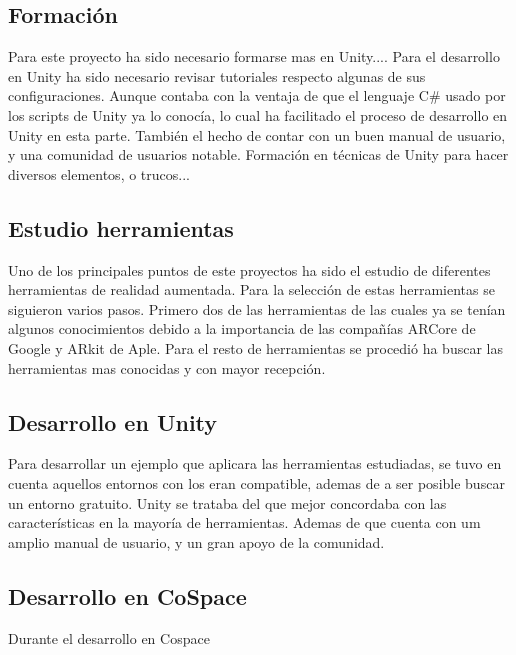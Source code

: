 
\subsection{Formación}
Para este proyecto ha sido necesario formarse mas en Unity....
Para el desarrollo en Unity ha sido necesario revisar tutoriales respecto algunas de sus configuraciones.
Aunque contaba con la ventaja de que el lenguaje C\# usado por los scripts de Unity ya lo conocía, lo cual ha facilitado el proceso de desarrollo en Unity en esta parte. También el hecho de contar con un buen manual de usuario, y una comunidad de usuarios notable.
Formación en técnicas de Unity para hacer diversos elementos, o trucos...
\subsection{Estudio herramientas}
Uno de los principales puntos de este proyectos ha sido el estudio de diferentes herramientas de realidad aumentada. Para la selección de estas herramientas se siguieron varios pasos. Primero dos de las herramientas de las cuales ya se tenían algunos conocimientos debido a la importancia de las compañías ARCore de Google y ARkit de Aple. Para el resto de herramientas se procedió ha buscar las herramientas mas conocidas y con mayor recepción.
\subsection{Desarrollo en Unity}
Para desarrollar un ejemplo que aplicara las herramientas estudiadas, se tuvo en cuenta aquellos entornos con los eran compatible, ademas de a ser posible buscar un entorno gratuito. Unity se trataba del que mejor concordaba con las características en la mayoría de herramientas. Ademas de que cuenta con um amplio manual de usuario, y un gran apoyo de la comunidad.
\subsection{Desarrollo en CoSpace}
Durante el desarrollo en Cospace




